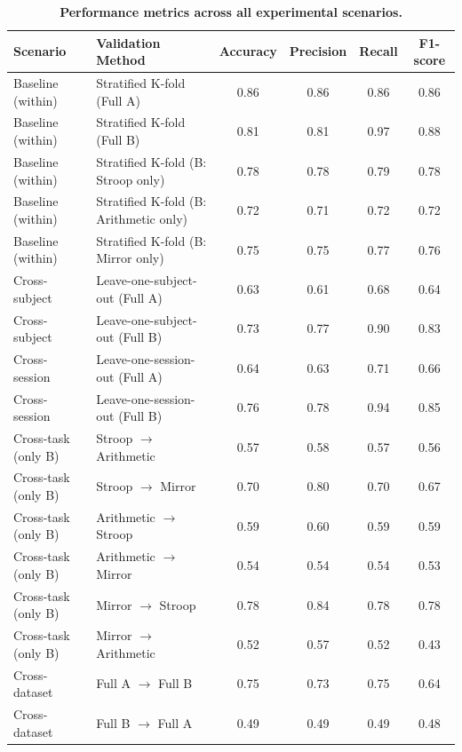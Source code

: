 \begin{table}[!ht]
\centering
\caption{\textbf{Performance metrics across all experimental scenarios.}}
\label{tab:results}
\begin{tabular}{|l|l|c|c|c|c|}
\hline
\textbf{Scenario} & \textbf{Validation Method} & \textbf{Accuracy} & \textbf{Precision} & \textbf{Recall} & \textbf{F1-score} \\
\hline
Baseline (within)  & Stratified K-fold (Full A)                & 0.86 & 0.86 & 0.86 & 0.86 \\
Baseline (within)  & Stratified K-fold (Full B)                & 0.81 & 0.81 & 0.97 & 0.88 \\
Baseline (within)  & Stratified K-fold (B: Stroop only)        & 0.78 & 0.78 & 0.79 & 0.78 \\
Baseline (within)  & Stratified K-fold (B: Arithmetic only)    & 0.72 & 0.71 & 0.72 & 0.72 \\
Baseline (within)  & Stratified K-fold (B: Mirror only)        & 0.75 & 0.75 & 0.77 & 0.76 \\
\hline
Cross-subject      & Leave-one-subject-out (Full A)            & 0.63 & 0.61 & 0.68 & 0.64 \\
Cross-subject      & Leave-one-subject-out (Full B)            & 0.73 & 0.77 & 0.90 & 0.83 \\
\hline
Cross-session      & Leave-one-session-out (Full A)             & 0.64 & 0.63 & 0.71 & 0.66 \\
Cross-session      & Leave-one-session-out (Full B)             & 0.76 & 0.78 & 0.94 & 0.85 \\
\hline
Cross-task (only B) & Stroop $\rightarrow$ Arithmetic  & 0.57 & 0.58 & 0.57 & 0.56 \\
Cross-task (only B) & Stroop $\rightarrow$ Mirror      & 0.70 & 0.80 & 0.70 & 0.67 \\
Cross-task (only B) & Arithmetic $\rightarrow$ Stroop  & 0.59 & 0.60 & 0.59 & 0.59 \\
Cross-task (only B) & Arithmetic $\rightarrow$ Mirror  & 0.54 & 0.54 & 0.54 & 0.53 \\
Cross-task (only B) & Mirror $\rightarrow$ Stroop      & 0.78 & 0.84 & 0.78 & 0.78 \\
Cross-task (only B) & Mirror $\rightarrow$ Arithmetic  & 0.52 & 0.57 & 0.52 & 0.43 \\
\hline
Cross-dataset       & Full A $\rightarrow$ Full B             & 0.75 & 0.73 & 0.75 & 0.64 \\
Cross-dataset       & Full B $\rightarrow$ Full A             & 0.49 & 0.49 & 0.49 & 0.48 \\

\end{tabular}
\end{table}
